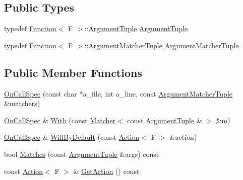 \subsection*{Public Types}
\begin{DoxyCompactItemize}
\item 
typedef \hyperlink{structtesting_1_1internal_1_1_function}{Function}$<$ F $>$\+::\hyperlink{classtesting_1_1internal_1_1_on_call_spec_a70ffab8b915b7b48a90f5ce256da806f}{Argument\+Tuple} \hyperlink{classtesting_1_1internal_1_1_on_call_spec_a70ffab8b915b7b48a90f5ce256da806f}{Argument\+Tuple}
\item 
typedef \hyperlink{structtesting_1_1internal_1_1_function}{Function}$<$ F $>$\+::\hyperlink{classtesting_1_1internal_1_1_on_call_spec_a3240f159f0a9d8cda208bc256da35074}{Argument\+Matcher\+Tuple} \hyperlink{classtesting_1_1internal_1_1_on_call_spec_a3240f159f0a9d8cda208bc256da35074}{Argument\+Matcher\+Tuple}
\end{DoxyCompactItemize}
\subsection*{Public Member Functions}
\begin{DoxyCompactItemize}
\item 
\hyperlink{classtesting_1_1internal_1_1_on_call_spec_ac7077e8162a10714e463b64a3cc7d054}{On\+Call\+Spec} (const char $\ast$a\+\_\+file, int a\+\_\+line, const \hyperlink{classtesting_1_1internal_1_1_on_call_spec_a3240f159f0a9d8cda208bc256da35074}{Argument\+Matcher\+Tuple} \&matchers)
\item 
\hyperlink{classtesting_1_1internal_1_1_on_call_spec}{On\+Call\+Spec} \& \hyperlink{classtesting_1_1internal_1_1_on_call_spec_a2421cc9ac5c954a3a4c9275c35771bad}{With} (const \hyperlink{classtesting_1_1_matcher}{Matcher}$<$ const \hyperlink{classtesting_1_1internal_1_1_on_call_spec_a70ffab8b915b7b48a90f5ce256da806f}{Argument\+Tuple} \& $>$ \&m)
\item 
\hyperlink{classtesting_1_1internal_1_1_on_call_spec}{On\+Call\+Spec} \& \hyperlink{classtesting_1_1internal_1_1_on_call_spec_a1c6303bf46983f20f4d2a61752fa8663}{Will\+By\+Default} (const \hyperlink{classtesting_1_1_action}{Action}$<$ F $>$ \&action)
\item 
bool \hyperlink{classtesting_1_1internal_1_1_on_call_spec_a98603357e18be6450cd2154853bea3f7}{Matches} (const \hyperlink{classtesting_1_1internal_1_1_on_call_spec_a70ffab8b915b7b48a90f5ce256da806f}{Argument\+Tuple} \&args) const 
\item 
const \hyperlink{classtesting_1_1_action}{Action}$<$ F $>$ \& \hyperlink{classtesting_1_1internal_1_1_on_call_spec_ad560cd3f669be59d1159a962c76ba9b7}{Get\+Action} () const 
\end{DoxyCompactItemize}

